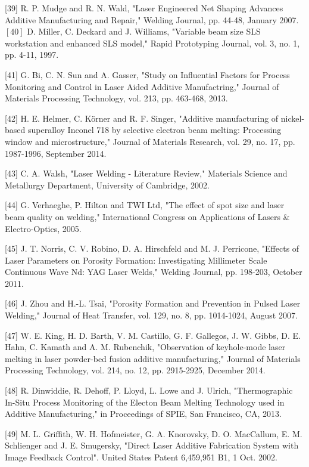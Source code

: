\documentclass[10pt]{article}
\begin{document}
[39] R. P. Mudge and R. N. Wald, "Laser Engineered Net Shaping Advances Additive Manufacturing and Repair," Welding Journal, pp. 44-48, January 2007.\\
$[40]$ D. Miller, C. Deckard and J. Williams, "Variable beam size SLS workstation and enhanced SLS model," Rapid Prototyping Journal, vol. 3, no. 1, pp. 4-11, 1997.

[41] G. Bi, C. N. Sun and A. Gasser, "Study on Influential Factors for Process Monitoring and Control in Laser Aided Additive Manufactring," Journal of Materials Processing Technology, vol. 213, pp. 463-468, 2013.

[42] H. E. Helmer, C. Körner and R. F. Singer, "Additive manufacturing of nickel-based superalloy Inconel 718 by selective electron beam melting: Processing window and microstructure," Journal of Materials Research, vol. 29, no. 17, pp. 1987-1996, September 2014.

[43] C. A. Walsh, "Laser Welding - Literature Review," Materials Science and Metallurgy Department, University of Cambridge, 2002.

[44] G. Verhaeghe, P. Hilton and TWI Ltd, "The effect of spot size and laser beam quality on welding," International Congress on Applications of Lasers \& Electro-Optics, 2005.

[45] J. T. Norris, C. V. Robino, D. A. Hirschfeld and M. J. Perricone, "Effects of Laser Parameters on Porosity Formation: Investigating Millimeter Scale Continuous Wave Nd: YAG Laser Welds," Welding Journal, pp. 198-203, October 2011.

[46] J. Zhou and H.-L. Tsai, "Porosity Formation and Prevention in Pulsed Laser Welding," Journal of Heat Transfer, vol. 129, no. 8, pp. 1014-1024, August 2007.

[47] W. E. King, H. D. Barth, V. M. Castillo, G. F. Gallegos, J. W. Gibbs, D. E. Hahn, C. Kamath and A. M. Rubenchik, "Observation of keyhole-mode laser melting in laser powder-bed fusion additive manufacturing," Journal of Materials Processing Technology, vol. 214, no. 12, pp. 2915-2925, December 2014.

[48] R. Dinwiddie, R. Dehoff, P. Lloyd, L. Lowe and J. Ulrich, "Thermographic In-Situ Process Monitoring of the Electon Beam Melting Technology used in Additive Manufacturing," in Proceedings of SPIE, San Francisco, CA, 2013.

[49] M. L. Griffith, W. H. Hofmeister, G. A. Knorovsky, D. O. MacCallum, E. M. Schlienger and J. E. Smugersky, "Direct Laser Additive Fabrication System with Image Feedback Control". United States Patent 6,459,951 B1, 1 Oct. 2002.
\end{document}
